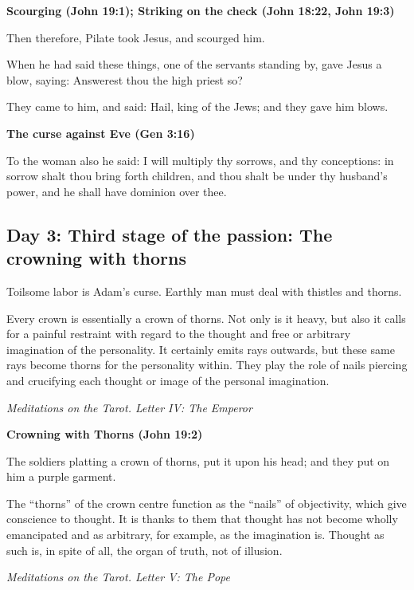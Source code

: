 \textbf{Scourging (John 19:1); Striking on the check (John 18:22, John 19:3)}

Then therefore, Pilate took Jesus, and scourged him.

When he had said these things, one of the servants standing by, gave Jesus a blow, saying: Answerest thou the high
priest so?

They came to him, and said: Hail, king of the Jews; and they gave him blows.

\textbf{The curse against Eve (Gen 3:16)}

To the woman also he said: I will multiply thy sorrows, and thy conceptions: in sorrow shalt thou bring forth children,
and thou shalt be under thy husband's power, and he shall have dominion over thee.

\subsection*{Day 3: Third stage of the passion: The crowning with thorns}
Toilsome labor is Adam's curse. Earthly man must deal with thistles and thorns.

\begin{quotationx}
Every crown is essentially a crown of thorns. Not only is it heavy, but also it calls for a painful restraint with
regard to the thought and free or arbitrary imagination of the personality. It certainly emits rays outwards, but these
same rays become thorns for the personality within. They play the role of nails piercing and crucifying each thought or
image of the personal imagination. \begin{flushright} \textit{Meditations on the Tarot. Letter IV: The Emperor} \end{flushright}

\end{quotationx}

\textbf{Crowning with Thorns (John 19:2)}

The soldiers platting a crown of thorns, put it upon his head; and they put on him a purple garment.

\begin{quotationx}
The “thorns” of the crown centre function as the “nails” of objectivity, which give conscience to thought. It is thanks
to them that thought has not become wholly emancipated and as arbitrary, for example, as the imagination is. Thought as
such is, in spite of all, the organ of truth, not of illusion. \begin{flushright} \textit{Meditations on the Tarot. Letter V: The Pope}\end{flushright}

\end{quotationx}

